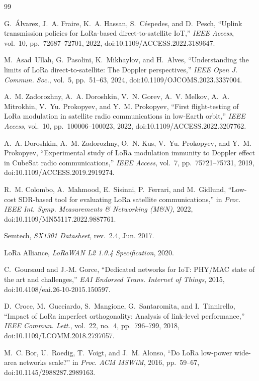 \documentclass[journal]{IEEEtran}
\begin{document}
\begin{thebibliography}{99}

 G.~\'Alvarez, J.~A. Fraire, K.~A. Hassan, S.~C\'espedes, and D.~Pesch, ``Uplink transmission policies for LoRa-based direct-to-satellite IoT,'' \emph{IEEE Access}, vol.~10, pp.~72687--72701, 2022, doi:10.1109/ACCESS.2022.3189647.

 M.~Asad~Ullah, G.~Pasolini, K.~Mikhaylov, and H.~Alves, ``Understanding the limits of LoRa direct-to-satellite: The Doppler perspectives,'' \emph{IEEE Open J. Commun. Soc.}, vol.~5, pp.~51--63, 2024, doi:10.1109/OJCOMS.2023.3337004.

 A.~M. Zadorozhny, A.~A. Doroshkin, V.~N. Gorev, A.~V. Melkov, A.~A. Mitrokhin, V.~Yu. Prokopyev, and Y.~M. Prokopyev, ``First flight-testing of LoRa modulation in satellite radio communications in low-Earth orbit,'' \emph{IEEE Access}, vol.~10, pp.~100006--100023, 2022, doi:10.1109/ACCESS.2022.3207762.

 A.~A. Doroshkin, A.~M. Zadorozhny, O.~N. Kus, V.~Yu. Prokopyev, and Y.~M. Prokopyev, ``Experimental study of LoRa modulation immunity to Doppler effect in CubeSat radio communications,'' \emph{IEEE Access}, vol.~7, pp.~75721--75731, 2019, doi:10.1109/ACCESS.2019.2919274.

 R.~M. Colombo, A.~Mahmood, E.~Sisinni, P.~Ferrari, and M.~Gidlund, ``Low-cost SDR-based tool for evaluating LoRa satellite communications,'' in \emph{Proc. IEEE Int. Symp. Measurements \& Networking (M\&N)}, 2022, doi:10.1109/MN55117.2022.9887761.

 Semtech, \emph{SX1301 Datasheet}, rev.~2.4, Jun. 2017.

 LoRa Alliance, \emph{LoRaWAN L2 1.0.4 Specification}, 2020.

 C.~Goursaud and J.-M. Gorce, ``Dedicated networks for IoT: PHY/MAC state of the art and challenges,'' \emph{EAI Endorsed Trans. Internet of Things}, 2015, doi:10.4108/eai.26-10-2015.150597.

 D.~Croce, M.~Gucciardo, S.~Mangione, G.~Santaromita, and I.~Tinnirello, ``Impact of LoRa imperfect orthogonality: Analysis of link-level performance,'' \emph{IEEE Commun. Lett.}, vol.~22, no.~4, pp.~796--799, 2018, doi:10.1109/LCOMM.2018.2797057.

 M.~C. Bor, U.~Roedig, T.~Voigt, and J.~M. Alonso, ``Do LoRa low-power wide-area networks scale?'' in \emph{Proc. ACM MSWiM}, 2016, pp.~59--67, doi:10.1145/2988287.2989163.


\end{thebibliography}
\end{document}
